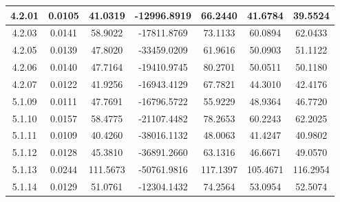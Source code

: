 \begin{table}[H]
\begin{tabular}{|c|cccc|cc|}
4.2.01 & \multicolumn{1}{c|}{0.0105} & \multicolumn{1}{c|}{41.0319} & \multicolumn{1}{c|}{-12996.8919} & 66.2440 & \multicolumn{1}{c|}{41.6784} & 39.5524 \\ \hline
4.2.03 & \multicolumn{1}{c|}{0.0141} & \multicolumn{1}{c|}{58.9022} & \multicolumn{1}{c|}{-17811.8769} & 73.1133 & \multicolumn{1}{c|}{60.0894} & 62.0433 \\ \hline
4.2.05 & \multicolumn{1}{c|}{0.0139} & \multicolumn{1}{c|}{47.8020} & \multicolumn{1}{c|}{-33459.0209} & 61.9616 & \multicolumn{1}{c|}{50.0903} & 51.1122 \\ \hline
4.2.06 & \multicolumn{1}{c|}{0.0140} & \multicolumn{1}{c|}{47.7164} & \multicolumn{1}{c|}{-19410.9745} & 80.2701 & \multicolumn{1}{c|}{50.0511} & 50.1180 \\ \hline
4.2.07 & \multicolumn{1}{c|}{0.0122} & \multicolumn{1}{c|}{41.9256} & \multicolumn{1}{c|}{-16943.4129} & 67.7821 & \multicolumn{1}{c|}{44.3010} & 42.4176 \\ \hline
5.1.09 & \multicolumn{1}{c|}{0.0111} & \multicolumn{1}{c|}{47.7691} & \multicolumn{1}{c|}{-16796.5722} & 55.9229 & \multicolumn{1}{c|}{48.9364} & 46.7720 \\ \hline
5.1.10 & \multicolumn{1}{c|}{0.0157} & \multicolumn{1}{c|}{58.4775} & \multicolumn{1}{c|}{-21107.4482} & 78.2653 & \multicolumn{1}{c|}{60.2243} & 62.2025 \\ \hline
5.1.11 & \multicolumn{1}{c|}{0.0109} & \multicolumn{1}{c|}{40.4260} & \multicolumn{1}{c|}{-38016.1132} & 48.0063 & \multicolumn{1}{c|}{41.4247} & 40.9802 \\ \hline
5.1.12 & \multicolumn{1}{c|}{0.0128} & \multicolumn{1}{c|}{45.3810} & \multicolumn{1}{c|}{-36891.2660} & 63.1316 & \multicolumn{1}{c|}{46.6671} & 49.0570 \\ \hline
5.1.13 & \multicolumn{1}{c|}{0.0244} & \multicolumn{1}{c|}{111.5673} & \multicolumn{1}{c|}{-50761.9816} & 117.1397 & \multicolumn{1}{c|}{105.4671} & 116.2954 \\ \hline
5.1.14 & \multicolumn{1}{c|}{0.0129} & \multicolumn{1}{c|}{51.0761} & \multicolumn{1}{c|}{-12304.1432} & 74.2564 & \multicolumn{1}{c|}{53.0954} & 52.5074 \\ \hline
\end{tabular}
\end{table}

